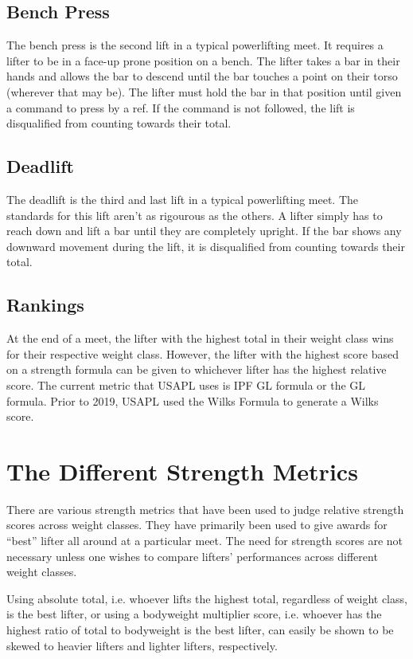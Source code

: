 \documentclass[10pt,letterpaper]{article}
\begin{document}
    \subsection*{Bench Press}
    The bench press is the second lift in a typical powerlifting meet. It requires a lifter to be in a face-up prone position on a bench. The lifter takes a bar in their hands and allows the bar to descend until the bar touches a point on their torso (wherever that may be). The lifter must hold the bar in that position until given a command to press by a ref. If the command is not followed, the lift is disqualified from counting towards their total. 
    \subsection*{Deadlift}
    The deadlift is the third and last lift in a typical powerlifting meet. The standards for this lift aren't as rigourous as the others. A lifter simply has to reach down and lift a bar until they are completely upright. If the bar shows any downward movement during the lift, it is disqualified from counting towards their total.
    \subsection*{Rankings}
    At the end of a meet, the lifter with the highest total in their weight class wins for their respective weight class. However, the lifter with the highest score based on a strength formula can be given to whichever lifter has the highest relative score. The current metric that USAPL uses is IPF GL formula or the GL formula. Prior to 2019, USAPL used the Wilks Formula to generate a Wilks score.

    \newpage 
    \section{The Different Strength Metrics}
    There are various strength metrics that have been used to judge relative strength scores across weight classes. They have primarily been used to give awards for ``best'' lifter all around at a particular meet. The need for strength scores are not necessary unless one wishes to compare lifters' performances across different weight classes. 
    
    Using absolute total, i.e. whoever lifts the highest total, regardless of weight class, is the best lifter, or using a bodyweight multiplier score, i.e. whoever has the highest ratio of total to bodyweight is the best lifter, can easily be shown to be skewed to heavier lifters and lighter lifters, respectively. 
    
\end{document}
